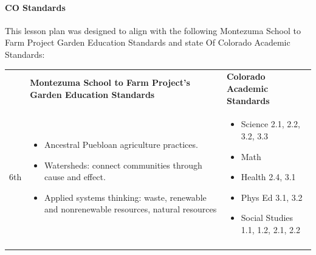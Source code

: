 \documentclass[12pt,]{article}
\providecommand{\tightlist}{%
  \setlength{\itemsep}{0pt}\setlength{\parskip}{0pt}}
\let\oldparagraph\paragraph
\renewcommand{\paragraph}[1]{\oldparagraph{#1}\mbox{}}
\begin{document}
\hypertarget{co-standards}{%
\paragraph{CO Standards}\label{co-standards}}

This lesson plan was designed to align with the following Montezuma School to Farm Project Garden Education Standards and state Of Colorado Academic Standards:

\begin{longtable}[]{@{}lll@{}}
\toprule
\endhead
\begin{minipage}[t]{0.09\columnwidth}\raggedright
\strut
\end{minipage} & \begin{minipage}[t]{0.44\columnwidth}\raggedright
\textbf{Montezuma School to Farm
Project's Garden Education
Standards}\strut
\end{minipage} & \begin{minipage}[t]{0.35\columnwidth}\raggedright
\textbf{Colorado Academic
Standards}\strut
\end{minipage}\tabularnewline
\begin{minipage}[t]{0.09\columnwidth}\raggedright
6th\strut
\end{minipage} & \begin{minipage}[t]{0.44\columnwidth}\raggedright
\begin{itemize}
\tightlist
\item
  Ancestral Puebloan agriculture
  practices.
\item
  Watersheds: connect communities
  through cause and effect.
\item
  Applied systems thinking:
  waste, renewable and
  nonrenewable resources,
  natural resources
\end{itemize}\strut
\end{minipage} & \begin{minipage}[t]{0.35\columnwidth}\raggedright
\begin{itemize}
\tightlist
\item
  Science 2.1, 2.2,
  3.2, 3.3
\item
  Math
\item
  Health 2.4, 3.1
\item
  Phys Ed 3.1, 3.2
\item
  Social Studies 1.1,
  1.2, 2.1, 2.2
\end{itemize}\strut
\end{minipage}\tabularnewline
\begin{minipage}[t]{0.09\columnwidth}\raggedright

\end{minipage}
\end{longtable}
\end{document}
